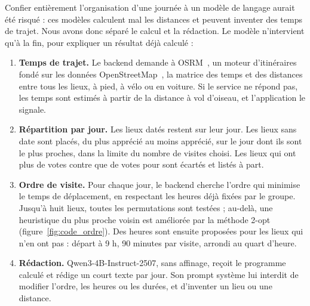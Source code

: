 Confier entièrement l'organisation d'une journée à un modèle de langage aurait été risqué :
ces modèles calculent mal les distances et peuvent inventer des temps de trajet. Nous avons
donc séparé le calcul et la rédaction. Le modèle n'intervient qu'à la fin, pour expliquer un
résultat déjà calculé :

\begin{enumerate}
  \item \textbf{Temps de trajet.} Le backend demande à OSRM~\cite{osrm}, un moteur
        d'itinéraires fondé sur les données OpenStreetMap~\cite{osm}, la matrice des temps et
        des distances entre tous les lieux, à pied, à vélo ou en voiture. Si le service ne
        répond pas, les temps sont estimés à partir de la distance à vol d'oiseau, et
        l'application le signale.
  \item \textbf{Répartition par jour.} Les lieux datés restent sur leur jour. Les lieux sans
        date sont placés, du plus apprécié au moins apprécié, sur le jour dont ils sont le plus
        proches, dans la limite du nombre de visites choisi. Les lieux qui ont plus de votes
        contre que de votes pour sont écartés et listés à part.
  \item \textbf{Ordre de visite.} Pour chaque jour, le backend cherche l'ordre qui minimise le
        temps de déplacement, en respectant les heures déjà fixées par le groupe. Jusqu'à huit
        lieux, toutes les permutations sont testées ; au-delà, une heuristique du plus proche
        voisin est améliorée par la méthode 2-opt~\cite{croes} (figure~\ref{fig:code_ordre}).
        Des heures sont ensuite proposées pour les lieux qui n'en ont pas : départ à 9 h,
        90 minutes par visite, arrondi au quart d'heure.
  \item \textbf{Rédaction.} Qwen3-4B-Instruct-2507, sans affinage, reçoit le programme
        calculé et rédige un court texte par jour. Son prompt système lui interdit de
        modifier l'ordre, les heures ou les durées, et d'inventer un lieu ou une distance.
\end{enumerate}

